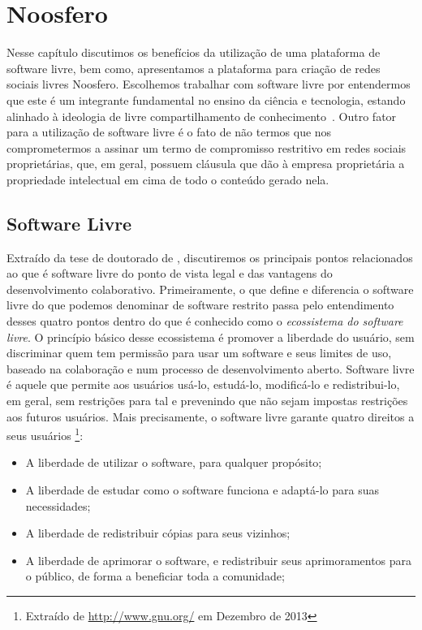 \chapter{Noosfero}
\label{cap:noosfero}

Nesse capítulo discutimos os benefícios da utilização de uma
plataforma de software livre, bem como, apresentamos a plataforma para criação de
redes sociais livres Noosfero.
%
Escolhemos trabalhar com software livre por
entendermos que este é um integrante fundamental no ensino da ciência e 
tecnologia, estando alinhado à ideologia de livre compartilhamento de
conhecimento~\cite{kon2011}.
%
Outro fator para a utilização de software livre é o
fato de não termos que nos comprometermos a assinar um termo de compromisso
restritivo em redes sociais proprietárias, que, em geral, possuem cláusula que dão à
empresa proprietária a propriedade intelectual em cima de todo o conteúdo
gerado nela.


\section{Software Livre}

Extraído da tese de doutorado de , discutiremos os
principais pontos relacionados ao que é software livre do ponto de vista legal e
das vantagens do desenvolvimento colaborativo.
%
Primeiramente, o que define e diferencia
o software livre do que podemos denominar de software restrito passa pelo
entendimento desses quatro pontos dentro do que é
conhecido como o \textit{ecossistema do software livre}.
%
O princípio básico desse ecossistema é promover a liberdade do usuário,
sem discriminar quem tem permissão para usar um software e seus limites de uso,
baseado na colaboração e num processo de desenvolvimento aberto.
%
Software livre é aquele que permite aos usuários usá-lo, estudá-lo, modificá-lo e
redistribui-lo, em geral, sem restrições para tal e prevenindo que não sejam
impostas restrições aos futuros usuários. 
%
Mais precisamente, o software livre garante quatro direitos a seus usuários%
\footnote{Extraído de \url{http://www.gnu.org/} em Dezembro de 2013}:

\begin{itemize}
  \item A liberdade de utilizar o software, para qualquer propósito;
  \item A liberdade de estudar como o software funciona e adaptá-lo para suas necessidades;
  \item A liberdade de redistribuir cópias para seus vizinhos;
  \item A liberdade de aprimorar o software, e redistribuir seus aprimoramentos para o público,
  de forma a beneficiar toda a comunidade;
\end{itemize}

